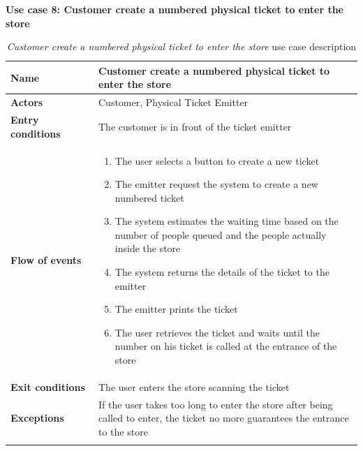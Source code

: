 \clearpage
\textbf{Use case 8: Customer create a numbered physical ticket to enter the store}
\smallskip
{}
\begin{longtable}{p{0.25\linewidth}p{0.75\linewidth}}
    \toprule
    \textbf{Name}             & \textbf{Customer create a numbered physical ticket to enter the store}                                                                   \\
    \midrule
    \textbf{Actors}           & Customer, Physical Ticket Emitter                                                                                                        \\
    \midrule
    \textbf{Entry conditions} & The customer is in front of the ticket emitter                                                                                           \\
    \midrule
    \textbf{Flow of events}   &
    \begin{enumerate}
        \item The user selects a button to create a new ticket
        \item The emitter request the system to create a new numbered ticket
        \item The system estimates the waiting time based on the number of people queued and the people actually inside the store
        \item The system returns the details of the ticket to the emitter
        \item The emitter prints the ticket
        \item The user retrieves the ticket and waits until the number on his ticket is called at the entrance of the store
    \end{enumerate}                                                                                                                                           \\
    \midrule
    \textbf{Exit conditions}  & The user enters the store scanning the ticket                                                                                            \\
    \midrule
    \textbf{Exceptions}       & If the user takes too long to enter the store after being called to enter, the ticket no more guarantees the entrance to the store \\
    \bottomrule
    \caption{\emph{Customer create a numbered physical ticket to enter the store} use case description}
\end{longtable}


